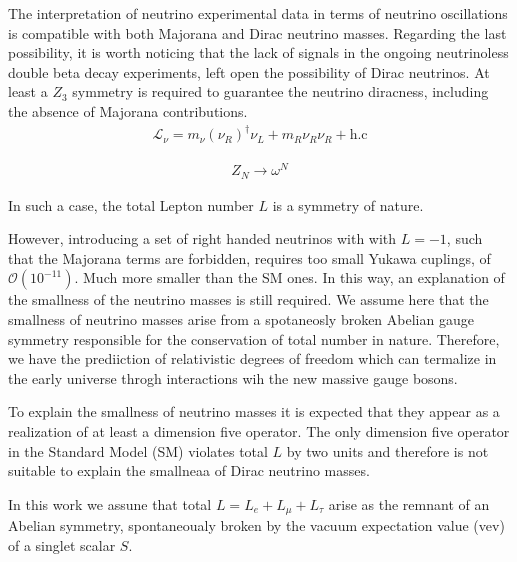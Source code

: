 \documentclass[12pt]{article}
\begin{document}






The interpretation of neutrino experimental data in terms of neutrino
oscillations is compatible with both Majorana and Dirac neutrino
masses. Regarding the last possibility, it is worth noticing that the
lack of signals in the ongoing neutrinoless double beta decay
experiments, left open the possibility of Dirac neutrinos.  At least a
$Z_3$ symmetry is required to guarantee the neutrino diracness,
including the absence of Majorana contributions.
\begin{align}
  \mathcal{L}_{\nu}=m_{\nu} \left( \nu_R \right)^{\dagger} \nu_L +
  m_R \nu_R \nu_R +\text{h.c}
\end{align}

\begin{align}
  \label{eq:1}
  Z_N \to \omega^N
\end{align}



In such a case, the total Lepton number $L$ is a symmetry of nature.

However, introducing a set of right handed neutrinos with with $L=-1$,
such that the Majorana terms are forbidden, requires too small Yukawa cuplings, of $\mathcal{O}(10^{-11})$. Much more smaller than the SM ones. In this way, an explanation of the smallness of the neutrino masses is still required. We assume here that the smallness of neutrino masses arise from a spotaneosly broken Abelian gauge symmetry responsible for the conservation of total number in nature. Therefore, we have the prediiction of relativistic degrees of freedom which can termalize in the early universe throgh interactions wih the new massive gauge bosons.

To explain the smallness of neutrino masses it is expected that they appear as a realization of at least a  dimension five operator. The only dimension five operator in the Standard Model (SM) violates total $L$  by two units and therefore is not suitable to explain the smallneaa of Dirac neutrino masses.

In this work we assune that total $L=L_e+L_\mu+L_\tau$ arise as the remnant of an Abelian symmetry, spontaneoualy broken by the vacuum expectation value (vev) of a singlet scalar $S$. %
\end{document}
